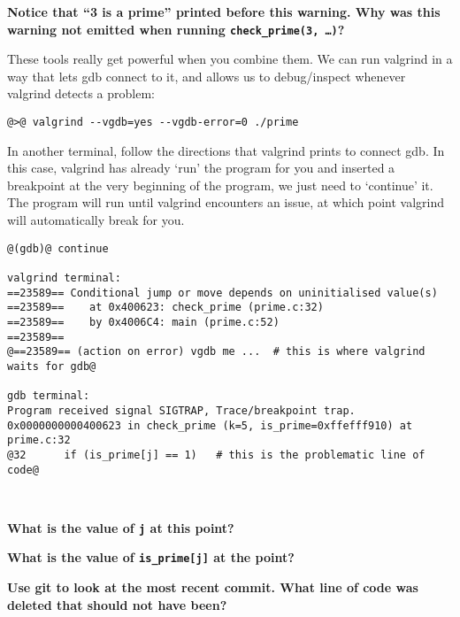\documentclass{article}
\begin{document}
\newpage
\textbf{Notice that ``3 is a prime'' printed before this warning. Why was this
  warning not emitted when running \texttt{check\_prime(3,~\dots)}?}
\vspace{2cm}

These tools really get powerful when you combine them. We can run valgrind in
a way that lets gdb connect to it, and allows us to debug/inspect whenever
valgrind detects a problem:
\begin{lstlisting}
@>@ valgrind --vgdb=yes --vgdb-error=0 ./prime
\end{lstlisting}
In another terminal, follow the directions that valgrind prints to connect
gdb. In this case, valgrind has already `run' the program for you and inserted
a breakpoint at the very beginning of the program, we just need to `continue'
it. The program will run until valgrind encounters an issue, at which point
valgrind will automatically break for you.
\begin{lstlisting}
@(gdb)@ continue

valgrind terminal:
==23589== Conditional jump or move depends on uninitialised value(s)
==23589==    at 0x400623: check_prime (prime.c:32)
==23589==    by 0x4006C4: main (prime.c:52)
==23589== 
@==23589== (action on error) vgdb me ...  # this is where valgrind waits for gdb@

gdb terminal:
Program received signal SIGTRAP, Trace/breakpoint trap.
0x0000000000400623 in check_prime (k=5, is_prime=0xffefff910) at prime.c:32
@32      if (is_prime[j] == 1)   # this is the problematic line of code@
\end{lstlisting}

~

\textbf{What is the value of \texttt{j} at this point?}\\
\vspace{1cm}

\textbf{What is the value of \texttt{is\_prime[j]} at the point?}\\
\vspace{1cm}

\textbf{Use git to look at the most recent commit. What line of code was
  deleted that should not have been?}
\end{document}
